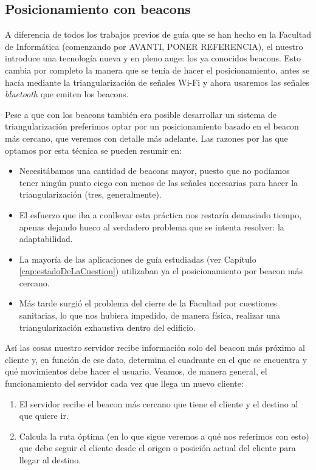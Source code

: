 \subsection{Posicionamiento con beacons}

A diferencia de todos los trabajos previos de guía que se han hecho en la Facultad de Informática (comenzando por AVANTI, PONER REFERENCIA), el nuestro introduce una tecnología nueva y en pleno auge: los ya conocidos beacons. Esto cambia por completo la manera que se tenía de hacer el posicionamiento, antes se hacía mediante la triangularización de señales Wi-Fi y ahora usaremos las señales \textit{bluetooth} que emiten los beacons.

Pese a que con los beacons también era posible desarrollar un sistema de triangularización preferimos optar por un posicionamiento basado en el beacon más cercano, que veremos con detalle más adelante. Las razones por las que optamos por esta técnica se pueden resumir en:

\begin{itemize}
	\item Necesitábamos una cantidad de beacons mayor, puesto que no podíamos tener ningún punto ciego con menos de las señales necesarias para hacer la triangularización (tres, generalmente). 
	
	\item El esfuerzo que iba a conllevar esta práctica nos restaría demasiado tiempo, apenas dejando hueco al verdadero problema que se intenta resolver: la adaptabilidad. 
	
	\item La mayoría de las aplicaciones de guía estudiadas (ver Capítulo \ref{cap:estadoDeLaCuestion}) utilizaban ya el posicionamiento por beacon más cercano.
	
	\item Más tarde surgió el problema del cierre de la Facultad por cuestiones sanitarias, lo que nos hubiera impedido, de manera física, realizar una triangularización exhaustiva dentro del edificio.
\end{itemize} 

Así las cosas nuestro servidor recibe información solo del beacon más próximo al cliente y, en función de ese dato, determina el cuadrante en el que se encuentra y qué movimientos debe hacer el usuario.  Veamos, de manera general, el funcionamiento del servidor cada vez que llega un nuevo cliente:

\begin{enumerate}
	\item El servidor recibe el beacon más cercano que tiene el cliente y el destino al que quiere ir.
	
	\item Calcula la ruta óptima (en lo que sigue veremos a qué nos referimos con esto) que debe seguir el cliente desde el origen o posición actual del cliente para llegar al destino. 
\end{enumerate}

